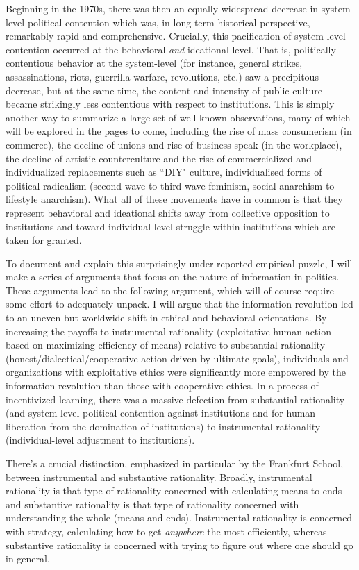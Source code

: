 \documentclass[12pt,book]{article}
\begin{document}
Beginning in the 1970s, there was then an equally widespread decrease in
system-level political contention which was, in long-term historical
perspective, remarkably rapid and comprehensive. Crucially, this
pacification of system-level contention occurred at the behavioral
\emph{and} ideational level. That is, politically contentious behavior
at the system-level (for instance, general strikes, assassinations,
riots, guerrilla warfare, revolutions, etc.) saw a precipitous decrease,
but at the same time, the content and intensity of public culture became
strikingly less contentious with respect to institutions. This is simply
another way to summarize a large set of well-known observations, many of
which will be explored in the pages to come, including the rise of mass
consumerism (in commerce), the decline of unions and rise of
business-speak (in the workplace), the decline of artistic
counterculture and the rise of commercialized and individualized
replacements such as ``DIY" culture, individualised forms of political
radicalism (second wave to third wave feminism, social anarchism to
lifestyle anarchism). What all of these movements have in common is that
they represent behavioral and ideational shifts away from collective
opposition to institutions and toward individual-level struggle within
institutions which are taken for granted.

To document and explain this surprisingly under-reported empirical
puzzle, I will make a series of arguments that focus on the nature of
information in politics. These arguments lead to the following argument,
which will of course require some effort to adequately unpack. I will
argue that the information revolution led to an uneven but worldwide
shift in ethical and behavioral orientations. By increasing the payoffs
to instrumental rationality (exploitative human action based on
maximizing efficiency of means) relative to substantial rationality
(honest/dialectical/cooperative action driven by ultimate goals),
individuals and organizations with exploitative ethics were
significantly more empowered by the information revolution than those
with cooperative ethics. In a process of incentivized learning, there
was a massive defection from substantial rationality (and system-level
political contention against institutions and for human liberation from
the domination of institutions) to instrumental rationality
(individual-level adjustment to institutions).

There's a crucial distinction, emphasized in particular by the Frankfurt
School, between instrumental and substantive rationality. Broadly,
instrumental rationality is that type of rationality concerned with
calculating means to ends and substantive rationality is that type of
rationality concerned with understanding the whole (means and ends).
Instrumental rationality is concerned with strategy, calculating how to
get \emph{anywhere} the most efficiently, whereas substantive
rationality is concerned with trying to figure out where one should go
in general.
\end{document}
